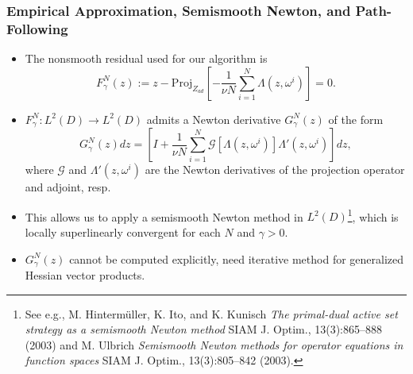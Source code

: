 \documentclass[aspectratio=169,xcolor=dvipsnames,11pt]{beamer}
\begin{document}
\begin{footnotesize}
\begin{frame}\frametitle{Empirical Approximation, Semismooth Newton, and Path-Following}
\begin{block}{}
\begin{itemize}
\item The \alert{nonsmooth} residual used for our algorithm is 
 \[
F_{\gamma}^{N}(z) := z - \mathrm{Proj}_{Z_{ad}}\left[-\frac{1}{\nu N} \sum_{i=1}^N \Lambda(z,\omega^i)\right] = 0.
\]
\item \pause $F_{\gamma}^{N} : L^2(D) \to L^2(D)$ admits a \alert{Newton derivative} $G_{\gamma}^{N}(z)$ of the form
\[
G_{\gamma}^{N}(z) dz =
\left[I + \frac{1}{\nu N} \sum_{i=1}^N \mathcal{G}\left[\Lambda(z,\omega^i)\right] \Lambda'(z,\omega^{i})\right] dz,
\]
where $\mathcal{G}$ and $\Lambda'(z,\omega^i)$ are the \alert{Newton derivatives of the projection operator and adjoint}, resp. 
\item \pause This allows us to apply a semismooth Newton method in $L^2(D)$\footnote{\tiny
See e.g., M. Hintermüller, K. Ito, and K. Kunisch \textit{The primal-dual active set strategy as a semismooth Newton method} SIAM J. Optim., 13(3):865–888 (2003)
and
M. Ulbrich \textit{Semismooth Newton methods for operator equations in function spaces} SIAM J. Optim., 13(3):805–842 (2003).}, 
which is locally superlinearly convergent for each $N$ and $\gamma > 0$. 
\item $G^N_{\gamma}(z)$ \alert{cannot be} computed explicitly, need iterative method for \alert{generalized Hessian vector products}.
\end{itemize}
\end{block}
\end{frame}


\end{footnotesize}
\end{document}
